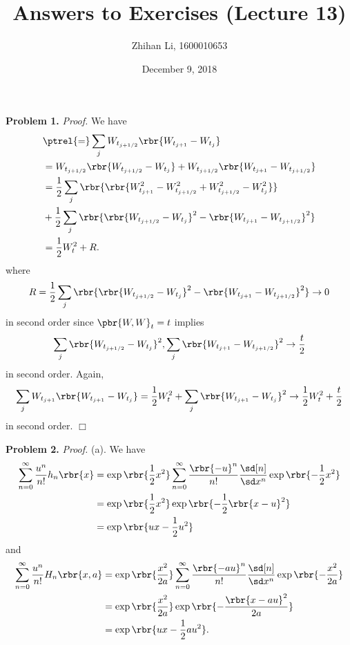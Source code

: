 \documentclass[english, nochinese]{pnote}
\title{Answers to Exercises (Lecture 13)}
\author{Zhihan Li, 1600010653}
\date{December 9, 2018}
\begin{document}
\maketitle

\textbf{Problem 1.} \textit{Proof.} We have
\begin{equation}
\begin{split}
&\ptrel{=} \sum_j W_{t_{ j + 1 / 2 }} \rbr{ W_{t_{ j + 1 }} - W_{t_j} } \\
&= W_{t_{ j + 1 / 2 }} \rbr{ W_{t_{ j + 1 / 2 }} - W_{t_j} } + W_{t_{ j + 1 / 2 }} \rbr{ W_{t_{ j + 1 }} - W_{t_{ j + 1 / 2 }} } \\
&= \frac{1}{2} \sum_j \rbr{ \rbr{ W_{t_{ j + 1 }}^2 - W_{t_{ j + 1 / 2 }}^2 + W_{t_{ j + 1 / 2 }}^2 - W_{t_j}^2 } } \\
&+ \frac{1}{2} \sum_j \rbr{ \rbr{ W_{t_{ j + 1 / 2 }}- W_{t_j} }^2 - \rbr{ W_{t_{ j + 1 }}- W_{t_{ j + 1 / 2 }} }^2 } \\
&= \frac{1}{2} W_t^2 + R.
\end{split}
\end{equation}
where
\begin{equation}
R = \frac{1}{2} \sum_j \rbr{ \rbr{ W_{t_{ j + 1 / 2 }}- W_{t_j} }^2 - \rbr{ W_{t_{ j + 1 }}- W_{t_{ j + 1 / 2 }} }^2 }\rightarrow 0
\end{equation}
in second order since $ \pbr{ W, W }_t = t $ implies
\begin{equation}
\sum_j \rbr{ W_{t_{ j + 1 / 2 }}- W_{t_j} }^2, \sum_j \rbr{ W_{t_{ j + 1 }}- W_{t_{ j + 1 / 2 }} }^2 \rightarrow \frac{t}{2}
\end{equation}
in second order. Again,
\begin{equation}
\sum_j W_{t_{ j + 1 }} \rbr{ W_{t_{ j + 1 }} - W_{t_j} } = \frac{1}{2} W_t^2 + \sum_j \rbr{ W_{t_{ j + 1 }} - W_{t_j} }^2 \rightarrow \frac{1}{2} W_t^2 + \frac{t}{2}
\end{equation}
in second order.
\hfill$\Box$

\textbf{Problem 2.} \textit{Proof.} (a). We have
\begin{equation}
\begin{split}
\sum_{ n = 0 }^{\infty} \frac{u^n}{ n ! } h_n \rbr{x} &= \exp \rbr{ \frac{1}{2} x^2 } \sum_{ n = 0 }^{\infty} \frac{\rbr{-u}^n}{ n ! } \frac{\sd[n]}{ \sd x^n } \exp \rbr{ -\frac{1}{2} x^2 } \\
&= \exp \rbr{ \frac{1}{2} x^2 } \exp \rbr{ -\frac{1}{2} \rbr{ x - u }^2 } \\
&= \exp \rbr{ u x - \frac{1}{2} u^2 }
\end{split}
\end{equation}
and
\begin{equation}
\begin{split}
\sum_{ n = 0 }^{\infty} \frac{u^n}{ n ! } H_n \rbr{ x, a } &= \exp \rbr{\frac{x^2}{ 2 a }} \sum_{ n = 0 }^{\infty} \frac{\rbr{ -a u }^n}{ n ! } \frac{\sd[n]}{ \sd x^n } \exp \rbr{-\frac{x^2}{ 2 a }} \\
&= \exp \rbr{\frac{x^2}{ 2 a }} \exp \rbr{-\frac{\rbr{ x - a u }^2}{ 2 a }} \\
&= \exp \rbr{ u x - \frac{1}{2} a u^2 }.
\end{split}
\end{equation}
\end{document}
